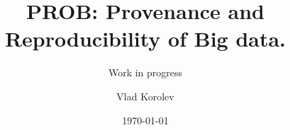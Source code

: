 \documentclass{beamer}
\title{PROB: Provenance and Reproducibility  of Big data.}
\subtitle{Work in progress}
\author{Vlad Korolev}
\date[]{ \today}
\begin{document}
{
\begin{frame}
  \titlepage
\end{frame}
}





\end{document}
